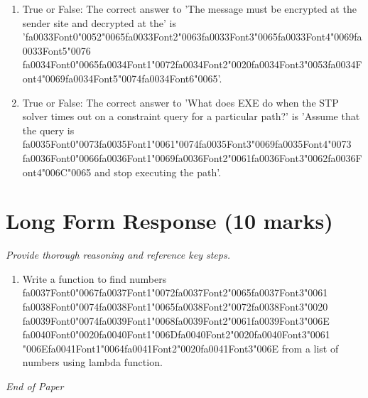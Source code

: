 \documentclass[12pt]{article}
\begin{document}
\begin{enumerate}[label=\arabic*.]
\item True or False: The correct answer to 'The message must be encrypted at the sender site and decrypted at the' is '{\csname fa0033Font0\endcsname\char"0052}{\char"0065}{\csname fa0033Font2\endcsname\char"0063}{\csname fa0033Font3\endcsname\char"0065}{\csname fa0033Font4\endcsname\char"0069}{\csname fa0033Font5\endcsname\char"0076} {\csname fa0034Font0\endcsname\char"0065}{\csname fa0034Font1\endcsname\char"0072}{\csname fa0034Font2\endcsname\char"0020}{\csname fa0034Font3\endcsname\char"0053}{\csname fa0034Font4\endcsname\char"0069}{\csname fa0034Font5\endcsname\char"0074}{\csname fa0034Font6\endcsname\char"0065}'.
\item True or False: The correct answer to 'What does EXE do when the STP solver times out on a constraint query for a particular path?' is 'Assume that the query is {\csname fa0035Font0\endcsname\char"0073}{\csname fa0035Font1\endcsname\char"0061}{\char"0074}{\csname fa0035Font3\endcsname\char"0069}{\csname fa0035Font4\endcsname\char"0073} {\csname fa0036Font0\endcsname\char"0066}{\csname fa0036Font1\endcsname\char"0069}{\csname fa0036Font2\endcsname\char"0061}{\csname fa0036Font3\endcsname\char"0062}{\csname fa0036Font4\endcsname\char"006C}{\char"0065} and stop executing the path'.
\end{enumerate}

\section*{Long Form Response (10 marks)}
\textit{Provide thorough reasoning and reference key steps.}
\begin{enumerate}[label=\arabic*.]
\item Write a function to find numbers {\csname fa0037Font0\endcsname\char"0067}{\csname fa0037Font1\endcsname\char"0072}{\csname fa0037Font2\endcsname\char"0065}{\csname fa0037Font3\endcsname\char"0061} {\csname fa0038Font0\endcsname\char"0074}{\csname fa0038Font1\endcsname\char"0065}{\csname fa0038Font2\endcsname\char"0072}{\csname fa0038Font3\endcsname\char"0020} {\csname fa0039Font0\endcsname\char"0074}{\csname fa0039Font1\endcsname\char"0068}{\csname fa0039Font2\endcsname\char"0061}{\csname fa0039Font3\endcsname\char"006E} {\csname fa0040Font0\endcsname\char"0020}{\csname fa0040Font1\endcsname\char"006D}{\csname fa0040Font2\endcsname\char"0020}{\csname fa0040Font3\endcsname\char"0061} {\char"006E}{\csname fa0041Font1\endcsname\char"0064}{\csname fa0041Font2\endcsname\char"0020}{\csname fa0041Font3\endcsname\char"006E} from a list of numbers using lambda
function.
\end{enumerate}

\vfill
\noindent\textit{End of Paper}
\end{document}
